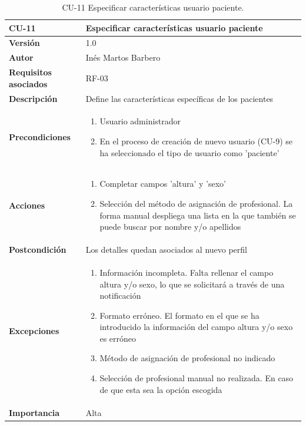 \begin{table}[p]
	\centering
	\begin{tabularx}{\linewidth}{ p{} p{} }
		\toprule
		\textbf{CU-11}    & \textbf{Especificar características usuario paciente}\\
		\toprule
		\textbf{Versión}              & 1.0    \\
		\textbf{Autor}                & Inés Martos Barbero \\
		\textbf{Requisitos asociados} & RF-03 \\
		\textbf{Descripción}          & Define las características específicas de los pacientes \\
		\textbf{Precondiciones}         & 
            \begin{enumerate}
    			\def\labelenumi{\arabic{enumi}.}
    			\tightlist
    			\item Usuario administrador
    			\item En el proceso de creación de nuevo usuario (CU-9) se ha seleccionado el tipo de usuario como 'paciente'
    		\end{enumerate}\\
		\textbf{Acciones}             &
		\begin{enumerate}
			\def\labelenumi{\arabic{enumi}.}
			\tightlist
			\item Completar campos 'altura' y 'sexo'
			\item Selección del método de asignación de profesional. La forma manual despliega una lista en la que también se puede buscar por nombre y/o apellidos
		\end{enumerate}\\
        \textbf{Postcondición}        & Los detalles quedan asociados al nuevo perfil \\
        \textbf{Excepciones}          & 
            \begin{enumerate}
    			\def\labelenumi{\arabic{enumi}.}
    			\tightlist
    			\item Información incompleta. Falta rellenar el campo altura y/o sexo, lo que se solicitará a través de una notificación
                \item Formato erróneo. El formato en el que se ha introducido la información del campo altura y/o sexo es erróneo
                \item Método de asignación de profesional no indicado
    			\item Selección de profesional manual no realizada. En caso de que esta sea la opción escogida
    		\end{enumerate}\\
		\textbf{Importancia}          & Alta \\
		\bottomrule
	\end{tabularx}
	\caption{CU-11 Especificar características usuario paciente.}
\end{table}

